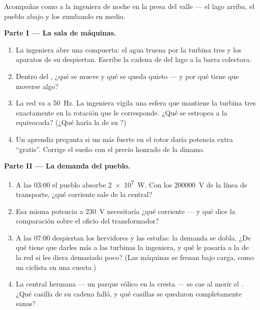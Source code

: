 \begin{problem}\label{pb:g9:alternator:1}
Acompañas como  a la ingeniera de noche en la presa del valle
--- el lago arriba, el pueblo abajo y los  zumbando en
medio.

\medskip\noindent\textbf{Parte I --- La sala de máquinas.}
\begin{enumerate}
  \item La ingeniera abre una compuerta: el agua truena por la
        turbina tres y los aparatos de su  despiertan.
        Escribe la cadena de  del lago a la barra
        colectora.
  \item Dentro del , ¿qué se mueve y qué se queda
        quieto --- y por qué tiene que moverse algo?
  \item La red va a \qty{50}{Hz}. La ingeniera vigila una esfera
        que mantiene la turbina tres exactamente en la rotación que
        le corresponde. ¿Qué se estropea a la
         equivocada? (¿Qué haría la
         de su ?)
  \item Un aprendiz pregunta si un  más fuerte en el rotor
        daría potencia extra ``gratis''. Corrige el sueño con el
        precio honrado de la dinamo.
\end{enumerate}

\medskip\noindent\textbf{Parte II --- La demanda del pueblo.}
\begin{enumerate}[resume]
  \item A las 03:00 el pueblo absorbe \qty{2e7}{W}. Con los
        \qty{200000}{V} de la línea de transporte, ¿qué corriente
        sale de la central?
  \item Esa misma potencia a \qty{230}{V} necesitaría ¿qué
        corriente --- y qué dice la comparación sobre el oficio del
        transformador?
  \item A las 07:00 despiertan los hervidores y las estufas: la
        demanda se dobla. ¿De qué tiene que darles más a las turbinas
        la ingeniera, y qué le pasaría a la  de la red
        si les diera demasiado poco? (Las máquinas se frenan bajo
        carga, como un ciclista en una cuesta.)
  \item La central hermana --- un parque eólico en la cresta --- se
        cae al morir el . ¿Qué casilla de su cadena falló, y
        qué casillas se quedaron completamente sanas?
\end{enumerate}


\end{problem}

